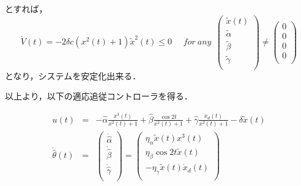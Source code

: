 \documentclass[a4paper,12pt]{jarticle}
\begin{document}
とすれば，
%
\begin{equation}
\dot{V}(t) = -2\delta c (x^2(t)+1)\tilde{x}^2(t) \leq 0 \ \ \ \ \ \ for \ any \ \ \begin{pmatrix}
\tilde{x}(t)\\ \tilde{\alpha}\\ \tilde{\beta}\\ \tilde{\gamma}\\
\end{pmatrix}
\neq
\begin{pmatrix}
0\\ 0\\ 0\\ 0\\ 
\end{pmatrix}								
\end{equation}
%
となり，システムを安定化出来る．

以上より，以下の適応追従コントローラを得る．

\begin{eqnarray}
  u(t)&=& -\hat{\alpha}\frac{x^3(t)}{x^2(t)+1} +\hat{\beta}\frac{\cos 2t}{x^2(t)+1}
  +\hat{\gamma}\frac{\dot{x}_d(t)}{x^2(t)+1} - \delta \tilde{x}(t) \\
  \dot{\hat{\theta}}(t)
  &=&
  \begin{pmatrix}
	 \dot{\hat{\alpha}}\\ \dot{\hat{\beta}}\\ \dot{\hat{\gamma}}\\
  \end{pmatrix}
  =
  \begin{pmatrix}
   \eta_{\alpha}\tilde{x}(t)x^3(t)\\
   \eta_{\beta}\cos 2t \tilde{x}(t)\\
   -\eta_{\gamma}\tilde{x}(t)\dot{x}_d(t)\\
  \end{pmatrix}
\end{eqnarray}

\end{document}
